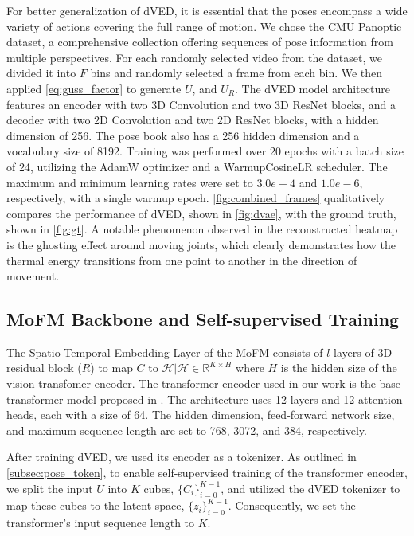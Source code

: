 For better generalization of dVED, it is essential that the poses encompass a wide variety of actions covering the full range of motion. We chose the CMU Panoptic dataset, a comprehensive collection offering sequences of pose information from multiple perspectives. For each randomly selected video from the dataset, we divided it into \(F\) bins and randomly selected a frame from each bin. We then applied \cref{eq:guss_factor} to generate \(U\), and \(U_R\). The dVED model architecture features an encoder with two 3D Convolution and two 3D ResNet blocks, and a decoder with two 2D Convolution and two 2D ResNet blocks, with a hidden dimension of 256. The pose book also has a 256 hidden dimension and a vocabulary size of 8192.
Training was performed over 20 epochs with a batch size of 24, utilizing the AdamW optimizer and a WarmupCosineLR scheduler. The maximum and minimum learning rates were set to $3.0e-4$ and $1.0e-6$, respectively, with a single warmup epoch. \cref{fig:combined_frames} qualitatively compares the performance of dVED, shown in \cref{fig:dvae}, with the ground truth, shown in \cref{fig:gt}. A notable phenomenon observed in the reconstructed heatmap is the ghosting effect around moving joints, which clearly demonstrates how the thermal energy transitions from one point to another in the direction of movement.



\subsection{MoFM Backbone and Self-supervised Training}
The Spatio-Temporal Embedding Layer of the MoFM consists of $\textit{l}$ layers of 3D residual block ($R$) to map $C$ to \(\mathcal{H} | \mathcal{H} \in \mathbb{R}^{K \times H}\) where $H$ is the hidden size of the vision transfomer encoder. The transformer encoder used in our work is the base transformer model proposed in \cite{dosovitskiy2021an, VaswaniTransformer}. The architecture uses 12 layers and 12 attention heads, each with a size of 64. The hidden dimension, feed-forward network size, and maximum sequence length are set to 768, 3072, and 384, respectively.
 
After training dVED, we used its encoder as a tokenizer. As outlined in \cref{subsec:pose_token}, to enable self-supervised training of the transformer encoder, we split the input \(U\) into \(K\) cubes, \(\{C_i\}_{i=0}^{K-1}\), and utilized the dVED tokenizer to map these cubes to the latent space, \(\{z_i\}_{i=0}^{K-1}\). Consequently, we set the transformer's input sequence length to \(K\). 

